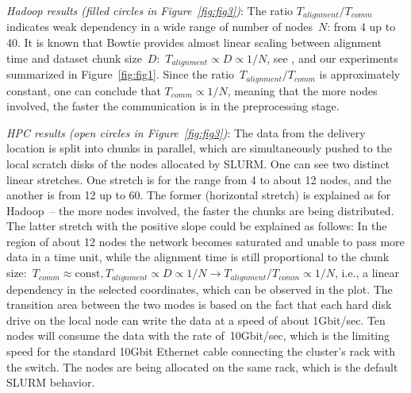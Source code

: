 \documentclass{bioinfo}
\begin{document}



\textit{Hadoop results (filled circles in Figure~\ref{fig:fig3})}: The ratio $T_{alignment}/T_{comm}$ indicates weak dependency in a wide range of number of nodes~$N$: from 4 up to 40. It is known that Bowtie provides almost linear scaling between alignment time and dataset chunk size~$D$:~$T_{alignment}\propto  D\propto 1/N$, see \citep{Langmead:2009uq}, and our experiments summarized in Figure~\ref{fig:fig1}. Since the ratio~$T_{alignment}/T_{comm}$ is approximately constant, one can conclude that $T_{comm}\propto 1/N$, meaning that the more nodes involved, the faster the communication is in the preprocessing stage.

\textit{HPC results (open circles in Figure~\ref{fig:fig3})}: The data from the delivery location is split into chunks in parallel, which are simultaneously pushed to the local scratch disks of the nodes allocated by SLURM\@. One can see two distinct linear stretches. One stretch is for the range from 4 to about 12 nodes, and the another is from 12 up to 60. The former (horizontal stretch) is explained as for Hadoop~-- the more nodes involved, the faster the chunks are being distributed. The latter stretch with the positive slope could be explained as follows: In the region of about 12 nodes the network becomes saturated
and unable to pass more data in a time unit, while the alignment time is still proportional to the chunk size:~$T_{comm}\approx\mbox{const}, T_{alignment}\propto D\propto 1/N \rightarrow T_{alignment}/T_{comm}\propto 1/N$, i.e., a linear dependency in the selected coordinates, which can be observed in the plot. 
The transition area between the two modes is based on the fact that each hard disk drive on the local node can write the data at a speed of about 1Gbit/sec. Ten nodes will consume the data with the rate of~10Gbit/sec, which is the limiting speed for the standard 10Gbit Ethernet cable connecting the cluster's rack with the switch. The nodes are being allocated on the same rack, which is the default SLURM behavior.
\end{document}

